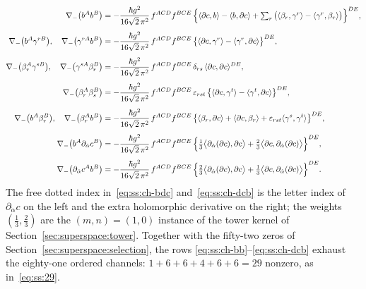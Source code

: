 \begin{align}
\nabla_{-}\big(b^{A}b^{B}\big)
&=-\frac{\hbar g^{2}}{16\sqrt2\,\pi^{2}}\,f^{ACD}f^{BCE}\,
\Big\{\langle\partial c,b\rangle-\langle b,\partial c\rangle
+\textstyle\sum_r\big(\langle\beta_r,\gamma^r\rangle
-\langle\gamma^r,\beta_r\rangle\big)\Big\}^{DE},
\label{eq:ss:ch-bb}\\[4pt]
\nabla_{-}\big(b^{A}\gamma^{rB}\big),\quad
\nabla_{-}\big(\gamma^{rA}b^{B}\big)
&=-\frac{\hbar g^{2}}{16\sqrt2\,\pi^{2}}\,f^{ACD}f^{BCE}\,
\big\{\langle\partial c,\gamma^{r}\rangle
-\langle\gamma^{r},\partial c\rangle\big\}^{DE},
\label{eq:ss:ch-bgamma}\\[4pt]
\nabla_{-}\big(\beta_{r}^{A}\gamma^{sB}\big),\quad
\nabla_{-}\big(\gamma^{sA}\beta_{r}^{B}\big)
&=-\frac{\hbar g^{2}}{16\sqrt2\,\pi^{2}}\,f^{ACD}f^{BCE}\,
\delta_{rs}\,\langle\partial c,\partial c\rangle^{DE},
\label{eq:ss:ch-betagamma}\\[4pt]
\nabla_{-}\big(\beta_{r}^{A}\beta_{s}^{B}\big)
&=-\frac{\hbar g^{2}}{16\sqrt2\,\pi^{2}}\,f^{ACD}f^{BCE}\,
\varepsilon_{rst}\,
\big\{\langle\partial c,\gamma^{t}\rangle
-\langle\gamma^{t},\partial c\rangle\big\}^{DE},
\label{eq:ss:ch-betabeta}\\[4pt]
\nabla_{-}\big(b^{A}\beta_{r}^{B}\big),\quad
\nabla_{-}\big(\beta_{r}^{A}b^{B}\big)
&=-\frac{\hbar g^{2}}{16\sqrt2\,\pi^{2}}\,f^{ACD}f^{BCE}\,
\big\{\langle\beta_{r},\partial c\rangle
+\langle\partial c,\beta_{r}\rangle
+\varepsilon_{rst}\langle\gamma^{s},\gamma^{t}\rangle\big\}^{DE},
\label{eq:ss:ch-bbeta}\\[4pt]
\nabla_{-}\big(b^{A}\partial_{\dot\alpha}c^{B}\big)
&=-\frac{\hbar g^{2}}{16\sqrt2\,\pi^{2}}\,f^{ACD}f^{BCE}\,
\Big\{\tfrac13\big\langle\partial_{\dot\alpha}(\partial c),\partial c\big\rangle
+\tfrac23\big\langle\partial c,\partial_{\dot\alpha}(\partial c)\big\rangle
\Big\}^{DE},
\label{eq:ss:ch-bdc}\\[4pt]
\nabla_{-}\big(\partial_{\dot\alpha}c^{A}b^{B}\big)
&=-\frac{\hbar g^{2}}{16\sqrt2\,\pi^{2}}\,f^{ACD}f^{BCE}\,
\Big\{\tfrac23\big\langle\partial_{\dot\alpha}(\partial c),\partial c\big\rangle
+\tfrac13\big\langle\partial c,\partial_{\dot\alpha}(\partial c)\big\rangle
\Big\}^{DE}.
\label{eq:ss:ch-dcb}
\end{align}
The free dotted index in~\eqref{eq:ss:ch-bdc} and~\eqref{eq:ss:ch-dcb} is the
letter index of $\partial_{\dot\alpha}c$ on the left and the extra holomorphic
derivative on the right; the weights $(\tfrac13,\tfrac23)$ are the
$(m,n)=(1,0)$ instance of the tower kernel of
Section~\ref{sec:superspace:tower}. Together with the fifty-two zeros of
Section~\ref{sec:superspace:selection}, the rows
\eqref{eq:ss:ch-bb}--\eqref{eq:ss:ch-dcb} exhaust the eighty-one ordered
channels: $1+6+6+4+6+6=29$ nonzero, as in~\eqref{eq:ss:29}.

